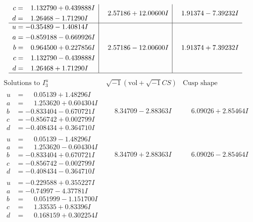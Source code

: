 \documentclass[1p]{elsarticle_modified}
\theoremstyle{definition}
\newcommand{\I}{\sqrt{-1}}
\begin{document}
$$\begin{array}{c|c|c}
\begin{aligned}
c &= \phantom{-}1.132790 + 0.439888 I \\
d &= \phantom{-}1.26468 - 1.71290 I\end{aligned}
 & \phantom{-}2.57186 + 12.00600 I & \phantom{-}1.91374 - 7.39232 I \\ \hline\begin{aligned}
u &= -0.35489 - 1.40814 I \\
a &= -0.859188 - 0.669926 I \\
b &= \phantom{-}0.964500 + 0.227856 I \\
c &= \phantom{-}1.132790 - 0.439888 I \\
d &= \phantom{-}1.26468 + 1.71290 I\end{aligned}
 & \phantom{-}2.57186 - 12.00600 I & \phantom{-}1.91374 + 7.39232 I\\
 \hline 
 \end{array}$$\newpage$$\begin{array}{c|c|c}  
\text{Solutions to }I^u_{3}& \I (\text{vol} + \sqrt{-1}CS) & \text{Cusp shape}\\
 \hline 
\begin{aligned}
u &= \phantom{-}0.05139 + 1.48296 I \\
a &= \phantom{-}1.253620 + 0.604304 I \\
b &= -0.833404 - 0.670721 I \\
c &= -0.856742 + 0.002799 I \\
d &= -0.408434 + 0.364710 I\end{aligned}
 & \phantom{-}8.34709 - 2.88363 I & \phantom{-}6.09026 + 2.85464 I \\ \hline\begin{aligned}
u &= \phantom{-}0.05139 - 1.48296 I \\
a &= \phantom{-}1.253620 - 0.604304 I \\
b &= -0.833404 + 0.670721 I \\
c &= -0.856742 - 0.002799 I \\
d &= -0.408434 - 0.364710 I\end{aligned}
 & \phantom{-}8.34709 + 2.88363 I & \phantom{-}6.09026 - 2.85464 I \\ \hline\begin{aligned}
u &= -0.229588 + 0.355227 I \\
a &= -0.74997 - 4.37781 I \\
b &= \phantom{-}0.051999 - 1.151700 I \\
c &= \phantom{-}1.33535 + 0.83396 I \\
d &= \phantom{-}0.168159 + 0.302254 I\end{aligned}

\end{array}$$
\end{document}
